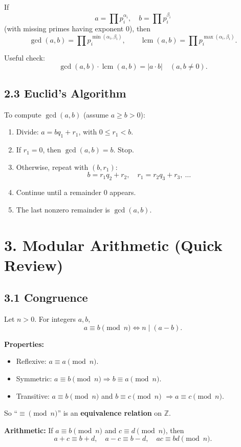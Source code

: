 \documentclass[11pt]{article}
\begin{document}
If
\[
a = \prod p_i^{\alpha_i},\quad b = \prod p_i^{\beta_i}
\]
(with missing primes having exponent $0$), then
\[
\gcd(a,b) = \prod p_i^{\min(\alpha_i,\beta_i)},\qquad
\operatorname{lcm}(a,b) = \prod p_i^{\max(\alpha_i,\beta_i)}.
\]

Useful check:
\[
\gcd(a,b)\cdot \operatorname{lcm}(a,b) = |a\cdot b|\quad(a,b\neq 0).
\]

\subsection*{2.3 Euclid's Algorithm}

To compute $\gcd(a,b)$ (assume $a\ge b>0$):

\begin{enumerate}
  \item Divide: $a = bq_1 + r_1$, with $0\le r_1<b$.
  \item If $r_1=0$, then $\gcd(a,b)=b$. Stop.
  \item Otherwise, repeat with $(b,r_1)$:
  \[
  b = r_1 q_2 + r_2,\quad
  r_1 = r_2 q_3 + r_3,\ \dots
  \]
  \item Continue until a remainder $0$ appears.
  \item The last nonzero remainder is $\gcd(a,b)$.
\end{enumerate}

\section*{3. Modular Arithmetic (Quick Review)}

\subsection*{3.1 Congruence}

Let $n>0$. For integers $a,b$,
\[
a \equiv b \pmod{n} \iff n\mid(a-b).
\]

\textbf{Properties:}
\begin{itemize}
  \item Reflexive: $a\equiv a\pmod{n}$.
  \item Symmetric: $a\equiv b\pmod{n} \Rightarrow b\equiv a\pmod{n}$.
  \item Transitive: $a\equiv b\pmod{n}$ and $b\equiv c\pmod{n}$ $\Rightarrow a\equiv c\pmod{n}$.
\end{itemize}
So ``$\equiv\pmod{n}$'' is an \textbf{equivalence relation} on $\mathbb{Z}$.

\textbf{Arithmetic:} If $a\equiv b\pmod{n}$ and $c\equiv d\pmod{n}$, then
\[
a+c\equiv b+d,\quad a-c\equiv b-d,\quad ac\equiv bd \pmod{n}.
\]
\end{document}
